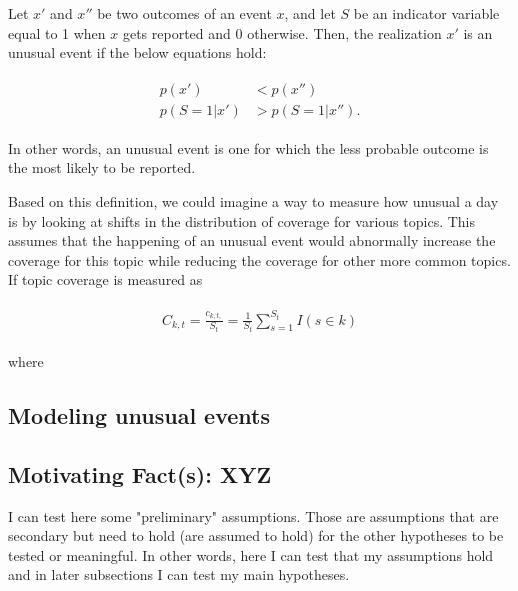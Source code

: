 \noindent Let $x'$ and $x''$ be two outcomes of an event $x$, and let $S$ be an indicator variable equal to 1 when $x$ gets reported and 0 otherwise. Then, the realization $x'$ is an unusual event if the below equations hold: 


\begin{align}
\begin{split}
p(x') &< p(x'') \\
p(S=1|x') &> p(S=1|x''). \nonumber
\end{split}
\end{align}

\noindent In other words, an unusual event is one for which the less probable outcome is the most likely to be reported.

Based on this definition, we could imagine a way to measure how unusual a day is by looking at shifts in the distribution of coverage for various topics.
This assumes that the happening of an unusual event would abnormally increase the coverage for this topic while reducing the coverage for other more common topics.
If topic coverage is measured as 

\begin{align}
\begin{split}
C_{k,t} = \frac{c_{k,t,}}{S_t}= \frac{1}{S_t} \sum_{s=1}^{S_t} I(s \in k)
\end{split}
\end{align}

\noindent where 

\subsection{Modeling unusual events}






\subsection{Motivating Fact(s): XYZ}
I can test here some "preliminary" assumptions. Those are assumptions that are secondary but need to hold (are assumed to hold) for the other hypotheses to be tested or meaningful.
In other words, here I can test that my assumptions hold and in later subsections I can test my main hypotheses.

